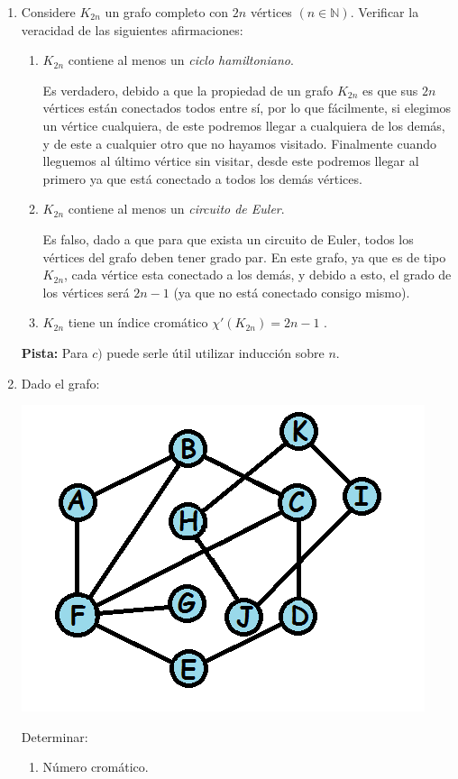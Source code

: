 \documentclass[spanish, fleqn]{article}
\title{Estructuras Discretas \\
       Tarea \#\num \\
       $``$\textit{Don Grafo ataca!}$"$}
\author{Andrés Navarro \\ 201673001-K}
\date{}
\begin{document}
\maketitle
\thispagestyle{empty}

\begin{enumerate}

\item Considere \(K_{2n} \) un grafo completo con \(2n\) vértices \((n\in \mathbb{N} )\). Verificar la veracidad de las siguientes afirmaciones:
\begin{enumerate}
\item \(K_{2n}\) contiene al menos un \textit{ciclo hamiltoniano}.

Es verdadero, debido a que la propiedad de un grafo $K_{2n}$ es que sus $2n$ vértices están conectados todos entre sí, por lo que fácilmente, si elegimos un vértice cualquiera, de este podremos llegar a cualquiera de los demás, y de este a cualquier otro que no hayamos visitado. Finalmente cuando lleguemos al último vértice sin visitar, desde este podremos llegar al primero ya que está conectado a todos los demás vértices.
 
\item \(K_{2n}\) contiene al menos un \textit{circuito de Euler}.

Es falso, dado a que para que exista un circuito de Euler, todos los vértices del grafo deben tener grado par. En este grafo, ya que es de tipo $K_{2n}$, cada vértice esta conectado a los demás, y debido a esto, el grado de los vértices será $2n-1$ (ya que no está conectado consigo mismo).

\item \(K_{2n}\) tiene un índice cromático \( \chi'(K_{2n}) = 2n - 1 \) .


\end{enumerate}

\textbf{Pista:} Para \( c) \) puede serle útil utilizar inducción sobre \(n\).

\item Dado el grafo:
\begin{center}
\includegraphics[scale=0.5]{Grafo2}
\end{center}
Determinar: 
\begin{enumerate}
\item{Número cromático.}


\end{enumerate}
\end{enumerate}
\end{document}
